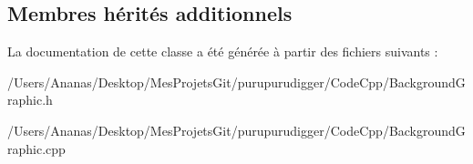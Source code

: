 \subsection*{Membres hérités additionnels}


La documentation de cette classe a été générée à partir des fichiers suivants \-:\begin{DoxyCompactItemize}
\item 
/\-Users/\-Ananas/\-Desktop/\-Mes\-Projets\-Git/purupurudigger/\-Code\-Cpp/Background\-Graphic.\-h\item 
/\-Users/\-Ananas/\-Desktop/\-Mes\-Projets\-Git/purupurudigger/\-Code\-Cpp/Background\-Graphic.\-cpp\end{DoxyCompactItemize}
